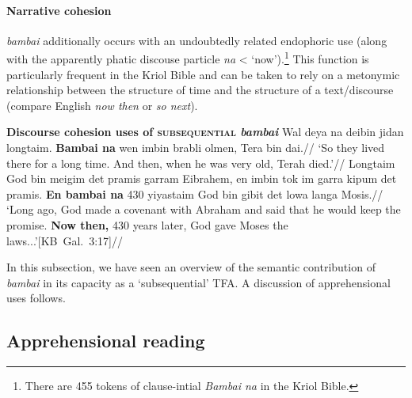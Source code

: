  \paragraph{Narrative cohesion} \textit{bambai} additionally occurs with an undoubtedly related endophoric use (along with the apparently phatic discouse particle \textit{na} < `now').\footnote{There are 455 tokens of clause-intial \textit{Bambai na} in the Kriol Bible.} This function is particularly frequent in the Kriol Bible and can be taken to rely on a metonymic relationship between the structure of time and the structure of a text/discourse (compare English \textit{now then} or \textit{so next}).
 
 
 \pex \textbf{Discourse cohesion uses of \textsc{subsequential} \textit{bambai}}
 \a\begingl\gla Wal deya na deibin jidan longtaim. \textbf{Bambai na} wen imbin brabli olmen, Tera bin dai.//
 \glft`So they lived there for a long time. And then, when he was very old, Terah died.'\trailingcitation{[KB~Jen.~11.32]}//\endgl
 \a\begingl\gla Longtaim God bin meigim det pramis garram Eibrahem, en imbin tok im garra kipum det pramis. \textbf{En bambai na} 430 yiyastaim God bin gibit det lowa langa Mosis.//
 \glft`Long ago, God made a covenant with Abraham and said that he would keep the promise.\textbf{ Now then,} 430 years later, God gave Moses the laws...'\trailingcitation[{KB~Gal.~3:17]}//\endgl
 
 \xe
 
 

In this subsection, we have seen an overview of the semantic contribution of \textit{bambai} in its capacity as a `subsequential' TFA. A discussion of apprehensional uses follows. %


	\subsection{Apprehensional reading}\label{dataSapp}



